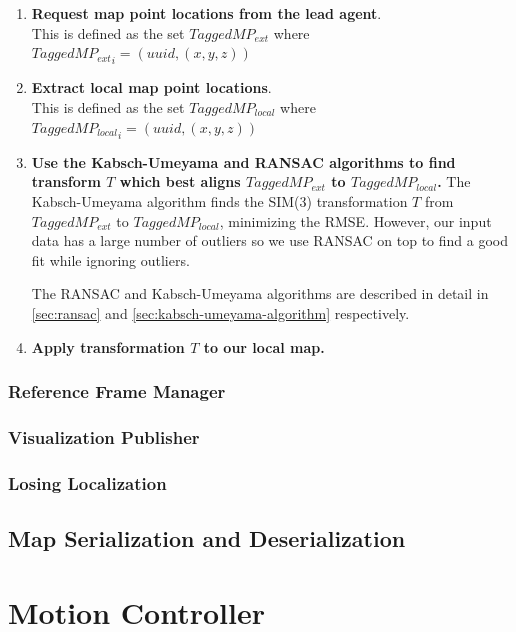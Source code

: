 \begin{enumerate}
    \item \textbf{Request map point locations from the lead agent}. \\
          This is defined as the set $TaggedMP_{ext}$ where ${TaggedMP_{ext}}_i = (uuid, (x, y, z))$
    \item \textbf{Extract local map point locations}. \\
          This is defined as the set $TaggedMP_{local}$ where ${TaggedMP_{local}}_i = (uuid, (x, y, z))$
    \item \textbf{Use the Kabsch-Umeyama and RANSAC algorithms to find transform $T$ which best aligns $TaggedMP_{ext}$ to $TaggedMP_{local}$.}
          The Kabsch-Umeyama algorithm finds the SIM(3) transformation $T$ from $TaggedMP_{ext}$ to $TaggedMP_{local}$, minimizing the RMSE. However, our input data has a large number of outliers so we use RANSAC on top to find a good fit while ignoring outliers.

          The RANSAC and Kabsch-Umeyama algorithms are described in detail in \autoref{sec:ransac} and \autoref{sec:kabsch-umeyama-algorithm} respectively.
    \item \textbf{Apply transformation $T$ to our local map.}
\end{enumerate}

\subsubsection{Reference Frame Manager}
\label{sec:reference-frame-manager}

\subsubsection{Visualization Publisher}
\label{sec:visualization-publisher}

\subsubsection{Losing Localization}
\label{sec:losing-localization}

\subsection{Map Serialization and Deserialization}
\label{sec:map-serialization-and-deserialization}

\section{Motion Controller}
\label{sec:motion-controller}

